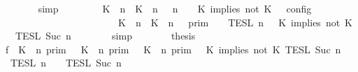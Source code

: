 \begin{isabellebody}
\ \ \ \ \ \ \isamarkupfalse%
\ simp\isanewline
\ \ \ \ \isamarkupfalse%
\ \isamarkupfalse%
\ {\isacartoucheopen}{\isasymlbrakk}\ {\isacharparenleft}{\isacharparenleft}K\ {\isasymUp}\ n{\isacharparenright}\ {\isacharhash}\ {\isacharparenleft}K\ {\isasymnot}{\isasymUp}\ n{\isacharparenright}\ {\isacharhash}\ {\isasymGamma}{\isacharparenright}{\isacharcomma}\ n\ {\isasymturnstile}\ {\isasymPsi}\ {\isasymtriangleright}\ {\isacharparenleft}{\isacharparenleft}K\ implies\ not\ K\ {\isacharhash}\ {\isasymPhi}{\isacharparenright}\ {\isasymrbrakk}\isactrlsub c\isactrlsub o\isactrlsub n\isactrlsub f\isactrlsub i\isactrlsub g\isanewline
\ \ \ \ \ \ \ \ \ \ \ \ \ \ \ \ \ \ \ \ \ \ {\isacharequal}\ {\isasymlbrakk}{\isasymlbrakk}\ {\isacharparenleft}{\isacharparenleft}K\ {\isasymUp}\ n{\isacharparenright}\ {\isacharhash}\ {\isacharparenleft}K\ {\isasymnot}{\isasymUp}\ n{\isacharparenright}\ {\isacharhash}\ {\isasymGamma}{\isacharparenright}\ {\isasymrbrakk}{\isasymrbrakk}\isactrlsub p\isactrlsub r\isactrlsub i\isactrlsub m\ {\isasyminter}\ {\isasymlbrakk}{\isasymlbrakk}\ {\isasymPsi}\ {\isasymrbrakk}{\isasymrbrakk}\isactrlsub T\isactrlsub E\isactrlsub S\isactrlsub L\isactrlbsup {\isasymge}\ n\isactrlesup \ {\isasyminter}\ {\isasymlbrakk}{\isasymlbrakk}\ {\isacharparenleft}K\ implies\ not\ K\ {\isacharhash}\ {\isasymPhi}\ {\isasymrbrakk}{\isasymrbrakk}\isactrlsub T\isactrlsub E\isactrlsub S\isactrlsub L\isactrlbsup {\isasymge}\ Suc\ n\isactrlesup {\isacartoucheclose}\isanewline
\ \ \ \ \ \ \isamarkupfalse%
\ simp\isanewline
\ \ \ \ \isamarkupfalse%
\ \isamarkupfalse%
\ {\isacharquery}thesis\isanewline
\ \ \ \ \isamarkupfalse%
\ {\isacharminus}\isanewline
\ \ \ \ \ \ \isamarkupfalse%
\ f{}{\isacharcolon}\ {\isacartoucheopen}{\isacharparenleft}{\isasymlbrakk}\ K\ {\isasymnot}{\isasymUp}\ n\ {\isasymrbrakk}\isactrlsub p\isactrlsub r\isactrlsub i\isactrlsub m\ {\isasymunion}\ {\isasymlbrakk}\ K\ {\isasymUp}\ n\ {\isasymrbrakk}\isactrlsub p\isactrlsub r\isactrlsub i\isactrlsub m\ {\isasyminter}\ {\isasymlbrakk}\ K\ {\isasymnot}{\isasymUp}\ n\ {\isasymrbrakk}\isactrlsub p\isactrlsub r\isactrlsub i\isactrlsub m{\isacharparenright}\ {\isasyminter}\ {\isasymlbrakk}\ K\ implies\ not\ K\ {\isasymrbrakk}\isactrlsub T\isactrlsub E\isactrlsub S\isactrlsub L\isactrlbsup {\isasymge}\ Suc\ n\isactrlesup \ {\isasyminter}\ {\isacharparenleft}{\isasymlbrakk}{\isasymlbrakk}\ {\isasymPsi}\ {\isasymrbrakk}{\isasymrbrakk}\isactrlsub T\isactrlsub E\isactrlsub S\isactrlsub L\isactrlbsup {\isasymge}\ n\isactrlesup \ {\isasyminter}\ {\isasymlbrakk}{\isasymlbrakk}\ {\isasymPhi}\ {\isasymrbrakk}{\isasymrbrakk}\isactrlsub T\isactrlsub E\isactrlsub S\isactrlsub L\isactrlbsup {\isasymge}\ Suc\ n\isactrlesup {\isacharparenright}\isanewline

\end{isabellebody}
